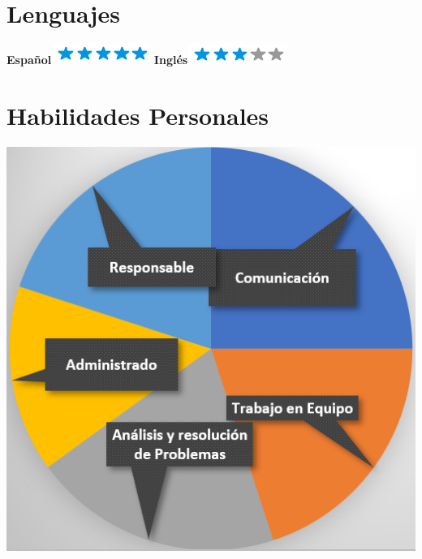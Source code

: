 \documentclass[]{friggeri-cv}
\begin{document}
\begin{aside}
  \section{Lenguajes}
    \textbf{Español}\includegraphics[scale=0.40]{img/5stars.png}
    \textbf{Inglés}\includegraphics[scale=0.40]{img/3stars.png}
  ~
  \section{Habilidades Personales}
    \includegraphics[scale=0.28]{H1.png}
    ~
\end{aside}
\end{document}
